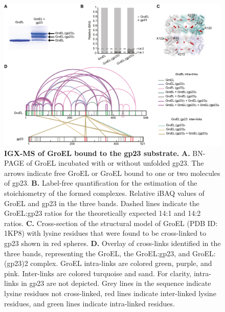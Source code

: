 \begin{subappendices}
    \begin{figure}[hbt!]
        \center
        \includegraphics[width=\textwidth]{Chapter.2/Figures/SI_Fig4.png} 
        \caption{\textbf{IGX-MS of GroEL bound to the gp23 substrate.} \textbf{A.} BN-PAGE of GroEL incubated with or without unfolded gp23. The arrows indicate free GroEL or GroEL bound to one or two molecules of gp23. \textbf{B.} Label-free quantification for the estimation of the stoichiometry of the formed complexes. Relative iBAQ values of GroEL and gp23 in the three bands. Dashed lines indicate the GroEL:gp23 ratios for the theoretically expected 14:1 and 14:2 ratios. \textbf{C.} Cross-section of the structural model of GroEL (PDB ID: 1KP8) with lysine residues that were found to be cross-linked to gp23 shown in red spheres. \textbf{D.} Overlay of cross-links identified in the three bands, representing the GroEL, the GroEL:gp23, and GroEL:(gp23)2 complex. GroEL intra-links are colored green, purple, and pink. Inter-links are colored turquoise and sand. For clarity, intra-links in gp23 are not depicted. Grey lines in the sequence indicate lysine residues not cross-linked, red lines indicate inter-linked lysine residues, and green lines indicate intra-linked residues.}
        \label{fig:ch2_app_fig4}
    \end{figure}


\end{subappendices}
